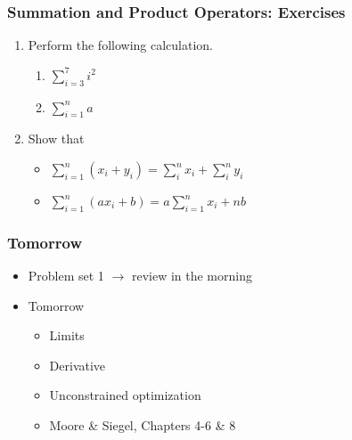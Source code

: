 \documentclass[pdflatex, 12pt]{beamer}
\begin{document}
\begin{frame}
\frametitle{Summation and Product Operators: Exercises}
\begin{enumerate}
\item Perform the following calculation.
 \begin{enumerate}
 \item $\sum_{i = 3}^{7} i^2$
 \item $\sum_{i = 1}^{n} a$
 \end{enumerate}
\vspace{0.4cm}
\item Show that
 \begin{itemize}
 \item $\sum_{i = 1}^{n} (x_i + y_i) = \sum_i^n x_i + \sum_i^n y_i$
 \item $\sum_{i = 1}^{n} (ax_i + b) = a\sum_{i = 1}^{n} x_i + nb$
 \end{itemize}
\end{enumerate}
\end{frame}

\begin{frame}
\frametitle{Tomorrow}
\begin{itemize}
\item Problem set 1 $\rightarrow$ review in the morning
\vspace{0.4cm}
\item Tomorrow
 \begin{itemize}
 \item Limits
 \item Derivative
 \item Unconstrained optimization
 \item Moore \& Siegel, Chapters 4-6 \& 8
 \end{itemize}
\end{itemize}
\end{frame}
\end{document}
